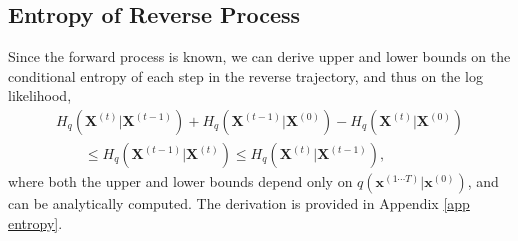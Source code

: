 \documentclass{article}
\newcommand{\mb}{\mathbf}
\newcommand{\pcondtraj}{q\left( \mb x^{(1\cdots T)} | \mb x^{(0)} \right)}
\begin{document}
\subsection{Entropy of Reverse Process}

Since the forward process is known, we can derive upper and lower bounds on the conditional entropy of each step in the reverse trajectory, and thus on the log likelihood,
\begin{align}
H_q\left( \mb X^{(t)} | \mb X^{(t-1)} \right) + H_q\left( \mb X^{(t-1)} | \mb X^{(0)} \right)  - H_q\left( \mb X^{(t)} | \mb X^{(0)} \right) 
\nonumber \\ \qquad
 \le
H_q\left( \mb X^{(t-1)} | \mb X^{(t)} \right)
\le
H_q\left( \mb X^{(t)} | \mb X^{(t-1)} \right)
,
\end{align}
where both the upper and lower bounds depend only on $\pcondtraj$, and can be analytically computed.  
The derivation is provided in Appendix \ref{app entropy}.



%
\end{document}
